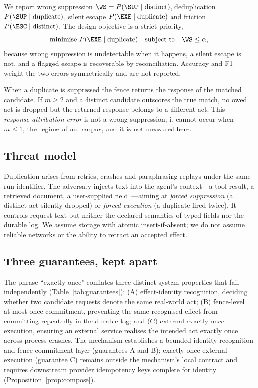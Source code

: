 We report wrong suppression $\WS=P(\SUP\mid\text{distinct})$, deduplication $P(\SUP\mid\text{duplicate})$, silent escape $P(\EXE\mid\text{duplicate})$ and friction $P(\ESC\mid\text{distinct})$. The design objective is a strict priority,
\begin{equation}\label{eq:objective}
\text{minimise } P(\EXE\mid\text{duplicate}) \quad\text{subject to}\quad \WS\le\alpha ,
\end{equation}
because wrong suppression is undetectable when it happens, a silent escape is not, and a flagged escape is recoverable by reconciliation. Accuracy and F1 weight the two errors symmetrically and are not reported.

When a duplicate is suppressed the fence returns the response of the matched candidate. If $m\ge2$ and a distinct candidate outscores the true match, no owed act is dropped but the returned response belongs to a different act. This \emph{response-attribution error} is not a wrong suppression; it cannot occur when $m\le1$, the regime of our corpus, and it is not measured here.

\subsection{Threat model}\label{sec:threat}

Duplication arises from retries, crashes and paraphrasing replays under the same run identifier. The adversary injects text into the agent's context---a tool result, a retrieved document, a user-supplied field~\cite{greshake2023injection}---aiming at \emph{forced suppression} (a distinct act silently dropped) or \emph{forced execution} (a duplicate fired twice). It controls request text but neither the declared semantics of typed fields nor the durable log. We assume storage with atomic insert-if-absent; we do not assume reliable networks or the ability to retract an accepted effect.

\subsection{Three guarantees, kept apart}\label{sec:guarantees}

The phrase ``exactly-once'' conflates three distinct system properties that fail independently (Table~\ref{tab:guarantees}): (A) effect-identity recognition, deciding whether two candidate requests denote the same real-world act; (B) fence-level at-most-once commitment, preventing the same recognised effect from committing repeatedly in the durable log; and (C) external exactly-once execution, ensuring an external service realises the intended act exactly once across process crashes. The mechanism establishes a bounded identity-recognition and fence-commitment layer (guarantees A and B); exactly-once external execution (guarantee C) remains outside the mechanism's local contract and requires downstream provider idempotency keys complete for identity (Proposition~\ref{prop:compose}).


